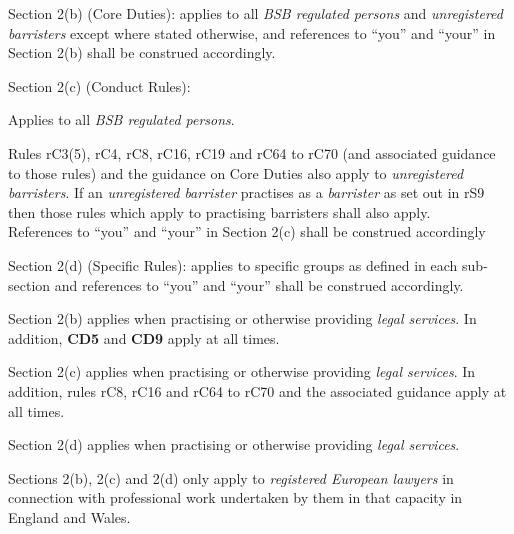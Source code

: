 \begin{numlist}\item Section 2(b) (Core Duties): applies to all \emph{BSB regulated
persons} and \emph{unregistered barristers} except where stated
otherwise, and references to ``you'' and ``your'' in Section 2(b) shall
be construed accordingly.

\item Section 2(c) (Conduct Rules):
\begin{alphlist}\item Applies to all \emph{BSB regulated persons}.
\item Rules rC3(5), rC4, rC8, rC16, rC19 and rC64 to rC70 (and associated
guidance to those rules) and the guidance on Core Duties also apply to
\emph{unregistered barristers}. If an \emph{unregistered barrister}
practises as a \emph{barrister} as set out in rS9 then those rules which
apply to practising barristers shall also apply.\\
References to ``you'' and ``your'' in Section 2(c) shall be construed
accordingly\end{alphlist}
\item Section 2(d) (Specific Rules): applies to specific groups as defined
in each sub-section and references to ``you'' and ``your'' shall be
construed accordingly.
\end{numlist}

\begin{numlist}\item Section 2(b) applies when practising or otherwise providing
\emph{legal services}. In addition,  \textbf{\textcolor{mygold}{CD5}} and  \textbf{\textcolor{mygold}{CD9}} apply at all times.
\item Section 2(c) applies when practising or otherwise providing
\emph{legal services}. In addition, rules rC8, rC16 and rC64 to rC70 and
the associated guidance apply at all times.
\item Section 2(d) applies when practising or otherwise providing
\emph{legal services}.
\item Sections 2(b), 2(c) and 2(d) only apply to \emph{registered European
lawyers} in connection with professional work undertaken by them in that
capacity in England and Wales.
\end{numlist}



